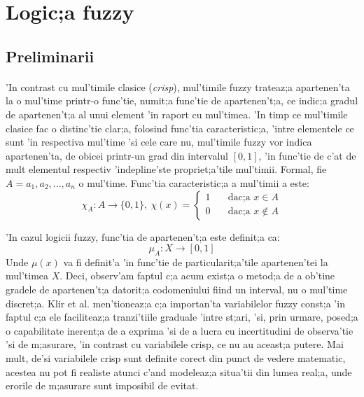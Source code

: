 \section{Logic;a fuzzy}
\subsection{Preliminarii}

\paragraph{}

'In contrast cu mul'timile clasice (\textit{crisp}), mul'timile fuzzy trateaz;a apartenen'ta la o mul'time printr-o func'tie, numit;a func'tie de apartenen't;a, ce indic;a gradul de apartenen't;a al unui element 'in raport cu mul'timea. 'In timp ce mul'timile clasice fac o distinc'tie clar;a, folosind func'tia caracteristic;a, 'intre elementele ce sunt 'in respectiva mul'time 'si cele care nu, mul'timile fuzzy vor indica apartenen'ta, de obicei printr-un grad din intervalul $[0, 1]$, 'in func'tie de c'at de mult elementul respectiv 'indepline'ste propriet;a'tile mul'timii.
Formal, fie $A = {a_{1}, a_{2}, ... , a_{n}}$ o mul'time. Func'tia caracteristic;a a mul'timii a este:
\begin{equation}
\chi_{A} : A \to \{0, 1\},\
\chi(x) = 				\begin{cases}
						1 & \quad \text{dac;a } x \in A \\
						0 & \quad \text{dac;a } x \notin A
					\end{cases}
\end{equation}
\par
'In cazul logicii fuzzy, func'tia de apartenen't;a este definit;a ca:
\begin{equation}
\mu_{A} : X \to [0, 1]
\end{equation}
Unde $\mu(x)$ va fi definit'a 'in func'tie de particularit;a'tile apartenen'tei la mul'timea $X$. Deci, observ'am faptul c;a acum exist;a o metod;a de a ob'tine gradele de apartenen't;a datorit;a codomeniului fiind un interval, nu o mul'time discret;a.
Klir et al. \cite{klirfuzzy} men'tioneaz;a c;a importan'ta variabilelor fuzzy const;a 'in faptul c;a ele faciliteaz;a tranzi'tiile graduale 'intre st;ari, 'si, prin urmare, posed;a o capabilitate inerent;a de a exprima 'si de a lucra cu incertitudini de observa'tie 'si de m;asurare, 'in contrast cu variabilele crisp, ce nu au aceast;a putere. Mai mult, de'si variabilele crisp sunt definite corect din punct de vedere matematic, acestea nu pot fi realiste atunci c'and modeleaz;a situa'tii din lumea real;a, unde erorile de m;asurare sunt imposibil de evitat. 
